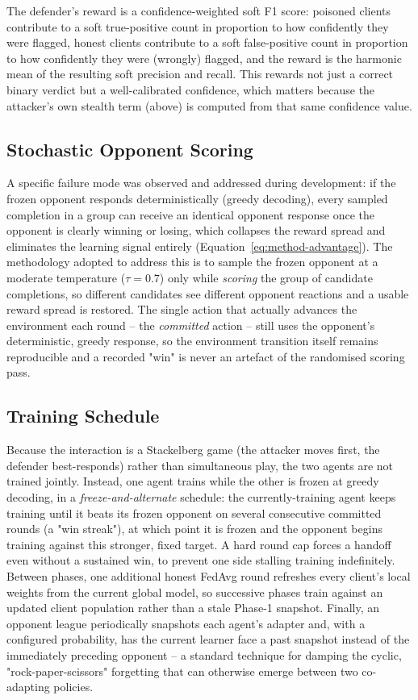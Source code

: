 The defender's reward is a confidence-weighted soft F1 score: poisoned clients contribute to a soft true-positive count in proportion to how confidently they were flagged, honest clients contribute to a soft false-positive count in proportion to how confidently they were (wrongly) flagged, and the reward is the harmonic mean of the resulting soft precision and recall. This rewards not just a correct binary verdict but a well-calibrated confidence, which matters because the attacker's own stealth term (above) is computed from that same confidence value.

\subsection{Stochastic Opponent Scoring}
\label{sec:method-stochastic}
A specific failure mode was observed and addressed during development: if the frozen opponent responds deterministically (greedy decoding), every sampled completion in a group can receive an identical opponent response once the opponent is clearly winning or losing, which collapses the reward spread and eliminates the learning signal entirely (Equation~\ref{eq:method-advantage}). The methodology adopted to address this is to sample the frozen opponent at a moderate temperature ($\tau = 0.7$) only while \emph{scoring} the group of candidate completions, so different candidates see different opponent reactions and a usable reward spread is restored. The single action that actually advances the environment each round -- the \emph{committed} action -- still uses the opponent's deterministic, greedy response, so the environment transition itself remains reproducible and a recorded "win" is never an artefact of the randomised scoring pass.

\subsection{Training Schedule}
Because the interaction is a Stackelberg game (the attacker moves first, the defender best-responds) rather than simultaneous play, the two agents are not trained jointly. Instead, one agent trains while the other is frozen at greedy decoding, in a \emph{freeze-and-alternate} schedule: the currently-training agent keeps training until it beats its frozen opponent on several consecutive committed rounds (a "win streak"), at which point it is frozen and the opponent begins training against this stronger, fixed target. A hard round cap forces a handoff even without a sustained win, to prevent one side stalling training indefinitely. Between phases, one additional honest FedAvg round refreshes every client's local weights from the current global model, so successive phases train against an updated client population rather than a stale Phase-1 snapshot. Finally, an opponent league periodically snapshots each agent's adapter and, with a configured probability, has the current learner face a past snapshot instead of the immediately preceding opponent -- a standard technique for damping the cyclic, "rock-paper-scissors" forgetting that can otherwise emerge between two co-adapting policies.


